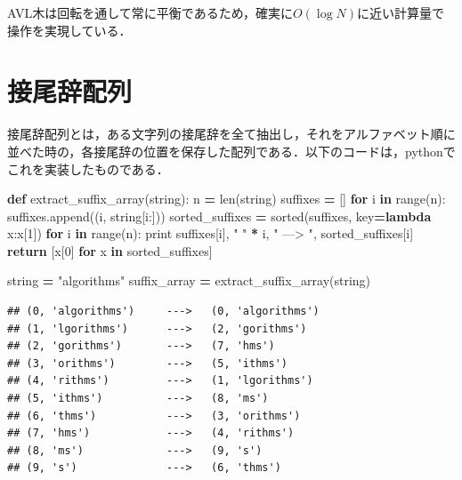\documentclass[
]{ltjarticle}
\newenvironment{Shaded}{\begin{snugshade}}{\end{snugshade}}
\newcommand{\BuiltInTok}[1]{#1}
\newcommand{\ControlFlowTok}[1]{\textcolor[rgb]{0.13,0.29,0.53}{\textbf{#1}}}
\newcommand{\DecValTok}[1]{\textcolor[rgb]{0.00,0.00,0.81}{#1}}
\newcommand{\KeywordTok}[1]{\textcolor[rgb]{0.13,0.29,0.53}{\textbf{#1}}}
\newcommand{\NormalTok}[1]{#1}
\newcommand{\OperatorTok}[1]{\textcolor[rgb]{0.81,0.36,0.00}{\textbf{#1}}}
\newcommand{\StringTok}[1]{\textcolor[rgb]{0.31,0.60,0.02}{#1}}
\begin{document}
AVL木は回転を通して常に平衡であるため，確実に\(O(\log N)\)に近い計算量で操作を実現している．

\newpage

\hypertarget{ux63a5ux5c3eux8f9eux914dux5217}{%
\section{接尾辞配列}\label{ux63a5ux5c3eux8f9eux914dux5217}}

接尾辞配列とは，ある文字列の接尾辞を全て抽出し，それをアルファベット順に並べた時の，各接尾辞の位置を保存した配列である．以下のコードは，pythonでこれを実装したものである．

\begin{Shaded}
\begin{Highlighting}[]
\KeywordTok{def}\NormalTok{ extract_suffix_array(string):}
\NormalTok{    n }\OperatorTok{=} \BuiltInTok{len}\NormalTok{(string)}
\NormalTok{    suffixes }\OperatorTok{=}\NormalTok{ []}
    \ControlFlowTok{for}\NormalTok{ i }\KeywordTok{in} \BuiltInTok{range}\NormalTok{(n):}
\NormalTok{        suffixes.append((i, string[i:]))}
\NormalTok{    sorted_suffixes }\OperatorTok{=} \BuiltInTok{sorted}\NormalTok{(suffixes, key}\OperatorTok{=}\KeywordTok{lambda}\NormalTok{ x:x[}\DecValTok{1}\NormalTok{])}
    \ControlFlowTok{for}\NormalTok{ i }\KeywordTok{in} \BuiltInTok{range}\NormalTok{(n):}
        \BuiltInTok{print}\NormalTok{ suffixes[i], }\StringTok{" "} \OperatorTok{*}\NormalTok{ i, }\StringTok{"   --->  "}\NormalTok{, sorted_suffixes[i]}
    \ControlFlowTok{return}\NormalTok{ [x[}\DecValTok{0}\NormalTok{] }\ControlFlowTok{for}\NormalTok{ x }\KeywordTok{in}\NormalTok{ sorted_suffixes]}

\NormalTok{string }\OperatorTok{=} \StringTok{"algorithms"}
\NormalTok{suffix_array }\OperatorTok{=}\NormalTok{ extract_suffix_array(string)}
\end{Highlighting}
\end{Shaded}

\begin{verbatim}
## (0, 'algorithms')     --->   (0, 'algorithms')
## (1, 'lgorithms')      --->   (2, 'gorithms')
## (2, 'gorithms')       --->   (7, 'hms')
## (3, 'orithms')        --->   (5, 'ithms')
## (4, 'rithms')         --->   (1, 'lgorithms')
## (5, 'ithms')          --->   (8, 'ms')
## (6, 'thms')           --->   (3, 'orithms')
## (7, 'hms')            --->   (4, 'rithms')
## (8, 'ms')             --->   (9, 's')
## (9, 's')              --->   (6, 'thms')
\end{verbatim}
\end{document}
